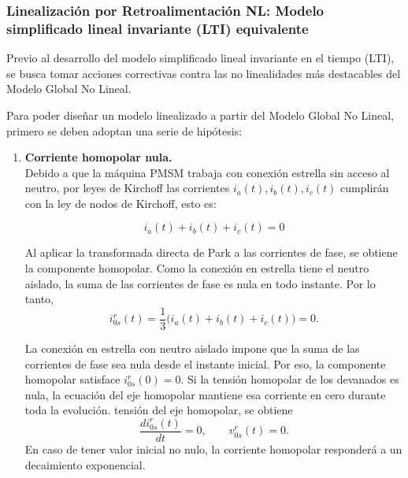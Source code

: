 \documentclass[blue,fullpaper]{ludusofficial}  %
\begin{document}
\subsubsection{ Linealización por Retroalimentación NL: Modelo simplificado lineal invariante (LTI)
equivalente}

Previo al desarrollo del modelo simplificado lineal invariante en el tiempo (LTI), se busca tomar acciones correctivas contra las no linealidades más destacables del Modelo Global No Lineal.

Para poder diseñar un modelo linealizado a partir del Modelo Global No Lineal, primero se deben adoptan una serie de hipótesis:

\begin{enumerate}
    \item \textbf{Corriente homopolar nula.} \\
    Debido a que la máquina PMSM trabaja con conexión estrella sin acceso al neutro, por leyes de Kirchoff las corrientes \(i_a(t), i_b(t), i_c(t)\) cumplirán con la ley de nodos de Kirchoff, esto es:

    \begin{equation}
\label{eq:corrientes-estrella}
        i_a(t) + i_b(t) + i_c(t) = 0 
    \end{equation}

Al aplicar la transformada directa de Park a las corrientes de fase,
se obtiene la componente homopolar. Como la conexión en estrella
tiene el neutro aislado, la suma de las corrientes de fase es nula
en todo instante. Por lo tanto,
\begin{equation}
\label{eq:corriente-cero-nula}
    i_{0s}^{r}(t)
    = \frac{1}{3}\bigl(i_a(t)+i_b(t)+i_c(t)\bigr)
    = 0.
\end{equation}

La conexión en estrella con neutro aislado impone que la suma de
las corrientes de fase sea nula desde el instante inicial. Por eso,
la componente homopolar satisface $i_{0s}^{r}(0)=0$. Si la tensión
homopolar de los devanados es nula, la ecuación del eje homopolar
mantiene esa corriente en cero durante toda la evolución.
tensión del eje homopolar, se obtiene
\begin{equation}
\label{eq:dinamica-cero-nula}
    \frac{di_{0s}^{r}(t)}{dt}=0,
    \qquad
    v_{0s}^{r}(t)=0.
\end{equation}
    En caso de tener valor inicial no nulo, la corriente homopolar responderá a un decaimiento exponencial.


\end{enumerate}
\end{document}
